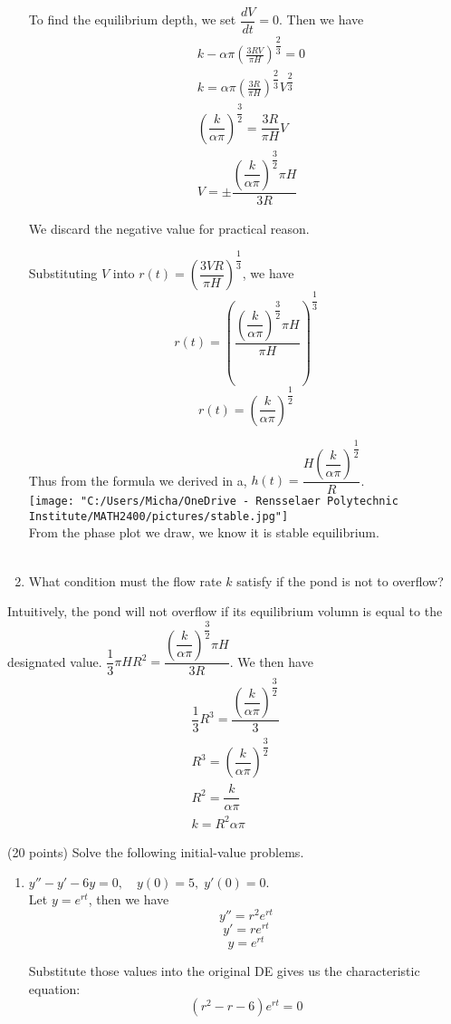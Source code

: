 \documentclass{article}
\def\a{\alpha } \def\b{\beta } \def\d{\delta } \def\D{\Delta } \def\e{\epsilon }
\newcommand{\benum}{\begin{enumerate}}
\newcommand{\eenum}{\end{enumerate}}
\begin{document}
\begin{enumerate}
To find the equilibrium depth, we set $\dfrac{dV}{dt} = 0$. Then we have 
\begin{align*}
	 &k - \a \pi \left(\frac{3RV}{\pi H}\right)^{\dfrac{2}{3}} = 0\\
	 &k = \a \pi \left(\frac{3R}{\pi H}\right)^{\dfrac{2}{3}} V^{\dfrac{2}{3}}\\
	 &(\dfrac{k}{\a \pi})^{\dfrac{3}{2}} = \dfrac{3R}{\pi H} V\\
	 &V = \pm \dfrac{(\dfrac{k}{\a \pi})^{\dfrac{3}{2}} \pi H}{3R}
\end{align*}

We discard the negative value for practical reason. 

Substituting $V$ into $r(t) = (\dfrac{3VR}{\pi H})^{\dfrac{1}{3}}$, we have $$r(t) = (\dfrac{(\dfrac{k}{\a \pi})^{\dfrac{3}{2}} \pi H}{\pi H})^{\dfrac{1}{3}}$$
$$r(t) = (\dfrac{k}{\a \pi})^{\dfrac{1}{2}}$$

Thus from the formula we derived in a, $h(t) = \dfrac{H(\dfrac{k}{\a \pi})^{\dfrac{1}{2}}}{R}$.\\
	\texttt{[image: "C:/Users/Micha/OneDrive - Rensselaer Polytechnic Institute/MATH2400/pictures/stable.jpg"]}\\
From the phase plot we draw, we know it is stable equilibrium.\\\\
\item What condition must the flow rate $k$ satisfy if the pond is not to overflow?
\eenum

Intuitively, the pond will not overflow if its equilibrium volumn is equal to the designated value. $\dfrac{1}{3} \pi H R^2 = \dfrac{(\dfrac{k}{\a \pi})^{\dfrac{3}{2}} \pi H}{3R}$. We then have 
\begin{align*}
	\dfrac{1}{3} R^3 = \dfrac{(\dfrac{k}{\a \pi})^{\dfrac{3}{2}}}{3}\\
	R^3 = (\dfrac{k}{\a \pi})^{\dfrac{3}{2}}\\
	R^2 = \dfrac{k}{\a \pi}\\
	k = R^2 \a \pi
\end{align*}
\newpage

\item (20 points)  
Solve the following initial-value problems.
\benum
\item $y''-y'-6y=0, \quad y(0)=5, \; y'(0)=0.$\\
Let $y = e^{rt}$, then we have $$y'' = r^2e^{rt}$$ $$y' = re^{rt}$$  $$y = e^{rt}$$

Substitute those values into the original DE gives us the characteristic equation: $$(r^2-r-6)e^{rt} = 0$$


\end{enumerate}
\end{document}
